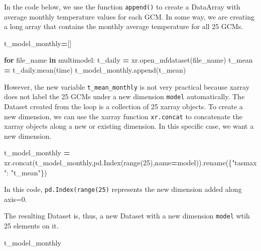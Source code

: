 \documentclass[
]{book}
\newenvironment{Shaded}{\begin{snugshade}}{\end{snugshade}}
\newcommand{\BuiltInTok}[1]{#1}
\newcommand{\ControlFlowTok}[1]{\textcolor[rgb]{0.13,0.29,0.53}{\textbf{#1}}}
\newcommand{\DecValTok}[1]{\textcolor[rgb]{0.00,0.00,0.81}{#1}}
\newcommand{\KeywordTok}[1]{\textcolor[rgb]{0.13,0.29,0.53}{\textbf{#1}}}
\newcommand{\NormalTok}[1]{#1}
\newcommand{\OperatorTok}[1]{\textcolor[rgb]{0.81,0.36,0.00}{\textbf{#1}}}
\newcommand{\StringTok}[1]{\textcolor[rgb]{0.31,0.60,0.02}{#1}}
\begin{document}
In the code below, we use the function \texttt{append()} to create a DataArray with average monthly temperature values for each GCM. In some way, we are creating a long array that contains the monthly average temperature for all 25 GCMs.

\begin{Shaded}
\begin{Highlighting}[]
\NormalTok{t\_model\_monthly}\OperatorTok{=}\NormalTok{[]}

\ControlFlowTok{for}\NormalTok{ file\_name }\KeywordTok{in}\NormalTok{ multimodel:}
\NormalTok{        t\_daily }\OperatorTok{=}\NormalTok{ xr.open\_mfdataset(file\_name)}
\NormalTok{        t\_mean }\OperatorTok{=}\NormalTok{ t\_daily.mean(}\StringTok{\textquotesingle{}time\textquotesingle{}}\NormalTok{)}
\NormalTok{        t\_model\_monthly.append(t\_mean)}
\end{Highlighting}
\end{Shaded}

However, the new variable \texttt{t\_mean\_monthly} is not very practical because xarray does not label the 25 GCMs under a new dimension \texttt{model} automatically. The Dataset created from the loop is a collection of 25 xarray objects. To create a new dimension, we can use the xarray function \texttt{xr.concat} to concatenate the xarray objects along a new or existing dimension. In this specific case, we want a new dimension.

\begin{Shaded}
\begin{Highlighting}[]
\NormalTok{t\_model\_monthly }\OperatorTok{=}\NormalTok{ xr.concat(t\_model\_monthly,pd.Index(}\BuiltInTok{range}\NormalTok{(}\DecValTok{25}\NormalTok{),name}\OperatorTok{=}\StringTok{\textquotesingle{}model\textquotesingle{}}\NormalTok{)).rename(\{}\StringTok{"tasmax"}\NormalTok{: }\StringTok{"t\_mean"}\NormalTok{\})}
\end{Highlighting}
\end{Shaded}

In this code, \texttt{pd.Index(range(25)} represents the new dimension added along axis=0.

The resulting Dataset is, thus, a new Dataset with a new dimension \texttt{model} wtih 25 elements on it.

\begin{Shaded}
\begin{Highlighting}[]
\NormalTok{t\_model\_monthly}
\end{Highlighting}
\end{Shaded}
\end{document}

